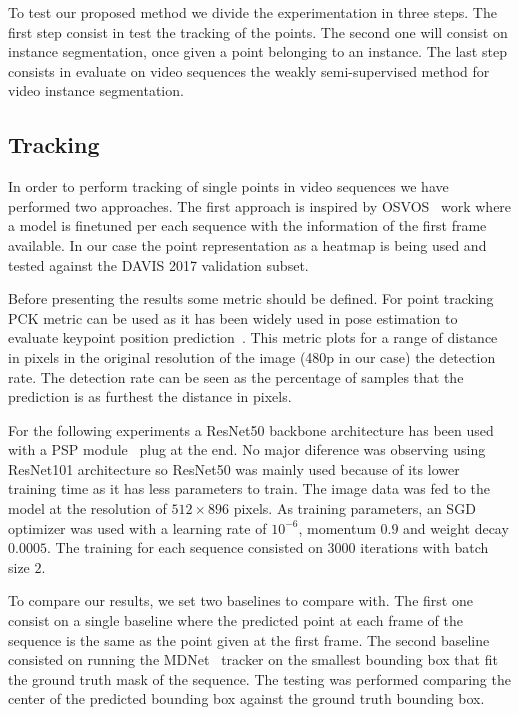 To test our proposed method we divide the experimentation in three steps.
The first step consist in test the tracking of the points.
The second one will consist on instance segmentation, once given a point belonging to an instance.
The last step consists in evaluate on video sequences the weakly semi-supervised method for video instance segmentation.

\subsection{Tracking}

In order to perform tracking of single points in video sequences we have performed two approaches.
The first approach is inspired by OSVOS~\cite{caelles2017one} work where a model is finetuned per each sequence with the information of the first frame available.
In our case the point representation as a heatmap is being used and tested against the DAVIS 2017 validation subset.

Before presenting the results some metric should be defined.
For point tracking PCK metric can be used as it has been widely used in pose estimation to evaluate keypoint position prediction~\cite{sapp2013modec}.
This metric plots for a range of distance in pixels in the original resolution of the image (480p in our case) the detection rate. The detection rate can be seen as the percentage of samples that the prediction is as furthest the distance in pixels.


For the following experiments a ResNet50 backbone architecture has been used with a PSP module~\cite{zhao2017pyramid} plug at the end.
No major diference was observing using ResNet101 architecture so ResNet50 was mainly used because of its lower training time as it has less parameters to train.
The image data was fed to the model at the resolution of $512 \times 896$ pixels.
As training parameters, an SGD optimizer was used with a learning rate of $10^{-6}$, momentum $0.9$ and weight decay $0.0005$. The training for each sequence consisted on 3000 iterations with batch size $2$.

To compare our results, we set two baselines to compare with.
The first one consist on a single baseline where the predicted point at each frame of the sequence is the same as the point given at the first frame.
The second baseline consisted on running the MDNet~\cite{nam2016learning} tracker on the smallest bounding box that fit the ground truth mask of the sequence. The testing was performed comparing the center of the predicted bounding box against the ground truth bounding box.


